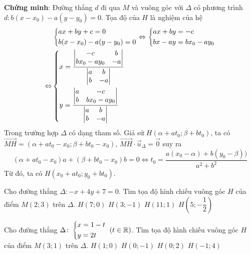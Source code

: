 \noindent \textbf{Chứng minh}: 
Đường thẳng $d$ đi qua $M$ và vuông góc với $\Delta$  có phương trình $d \colon b(x-x_0)-a(y-y_0)=0$. Tọa độ của $H$ là nghiệm của hệ  
\begin{align*}
& \left\{\begin{aligned}&ax+by+c=0\\&b(x-x_0)-a(y-y_0)=0\end{aligned}\right. \Leftrightarrow \left\{\begin{aligned}&ax +by=-c\\&bx-ay=bx_0-ay_0\end{aligned}\right. \\ \Leftrightarrow & \left\{\begin{aligned}&x= \dfrac{\begin{vmatrix}
-c & b  \\ 
bx_0-ay_0 & -a 
\end{vmatrix}}{\begin{vmatrix}
a & b  \\ 
b & -a 
\end{vmatrix}}\\&y= \dfrac{\begin{vmatrix}
a & -c  \\ 
b & bx_0-ay_0
\end{vmatrix}}{\begin{vmatrix}
a & b  \\ 
b & -a 
\end{vmatrix}}\end{aligned}\right.
\end{align*}
Trong trường hợp $\Delta$ có dạng tham số. Giả sử $H(\alpha+at_0;\beta+bt_0)$, ta có $\overrightarrow{MH}=(\alpha + at_0- x_0 ; \beta +bt_0 -x_0 )$, $\overrightarrow{MH} \cdot \overrightarrow{u}_{\Delta} = \overrightarrow{0}$ suy ra \[(\alpha + at_0- x_0)a + (\beta +bt_0 -x_0)b=0 \Leftrightarrow t_0= \dfrac{a(x_0-\alpha) + b(y_0-\beta))}{a^2+b^2}\]
Từ đó, ta có  $H \left ( x_0 + at_0; y_0+bt_0 \right ).$
\begin{vd}%
Cho đường thẳng $\Delta \colon -x+4y+7=0$. Tìm tọa độ hình chiếu vuông góc $H$ của điểm $M(2;3)$ trên $\Delta.$
\choice
{$H(7;0)$}
{\True $H(3;-1)$}
{$H(11;1)$}
{$H\left ( 5;-\dfrac{1}{2}\right )$}
\end{vd}


\begin{vd}%
Cho đường thẳng $\Delta \colon \left\{\begin{aligned}&x=1-t\\&y=2t\end{aligned}\right. ~ (t \in \mathbb{R})$. Tìm tọa độ hình chiếu vuông góc $H$ của điểm $M(3;1)$ trên $\Delta.$
\choice
{\True $H(1;0)$}
{$H(0;-1)$}
{$H(0;2)$}
{$H(-1;4)$}
\end{vd}


